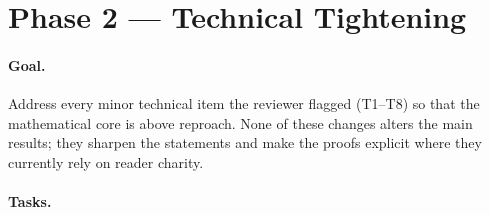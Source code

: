 \documentclass[11pt]{article}
\begin{document}
\section{Phase 2 --- Technical Tightening}
\label{sec:phase2}

\paragraph{Goal.} Address every minor technical item the reviewer flagged (T1--T8) so that the mathematical core is above reproach. None of these changes alters the main results; they sharpen the statements and make the proofs explicit where they currently rely on reader charity.

\paragraph{Tasks.}
\end{document}
